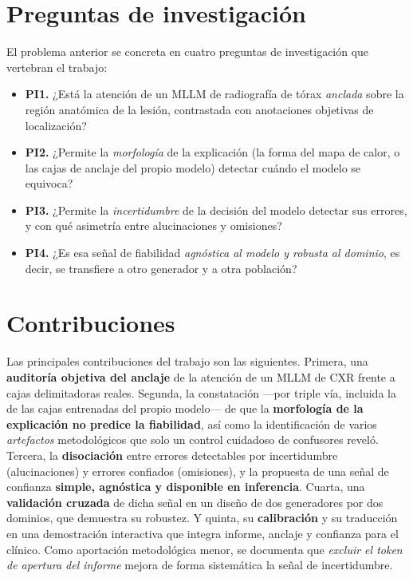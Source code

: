 \section{Preguntas de investigación}
El problema anterior se concreta en cuatro preguntas de investigación que vertebran el trabajo:
\begin{itemize}
  \item \textbf{PI1.} ¿Está la atención de un MLLM de radiografía de tórax \emph{anclada} sobre la
  región anatómica de la lesión, contrastada con anotaciones objetivas de localización?
  \item \textbf{PI2.} ¿Permite la \emph{morfología} de la explicación (la forma del mapa de calor, o
  las cajas de anclaje del propio modelo) detectar cuándo el modelo se equivoca?
  \item \textbf{PI3.} ¿Permite la \emph{incertidumbre} de la decisión del modelo detectar sus errores,
  y con qué asimetría entre alucinaciones y omisiones?
  \item \textbf{PI4.} ¿Es esa señal de fiabilidad \emph{agnóstica al modelo y robusta al dominio}, es
  decir, se transfiere a otro generador y a otra población?
\end{itemize}

\clearpage
\section{Contribuciones}
Las principales contribuciones del trabajo son las siguientes. Primera, una \textbf{auditoría
objetiva del anclaje} de la atención de un MLLM de CXR frente a cajas delimitadoras reales. Segunda,
la constatación —por triple vía, incluida la de las cajas entrenadas del propio modelo— de que la
\textbf{morfología de la explicación no predice la fiabilidad}, así como la identificación de varios
\emph{artefactos} metodológicos que solo un control cuidadoso de confusores reveló. Tercera, la
\textbf{disociación} entre errores detectables por incertidumbre (alucinaciones) y errores confiados
(omisiones), y la propuesta de una señal de confianza \textbf{simple, agnóstica y disponible en
inferencia}. Cuarta, una \textbf{validación cruzada} de dicha señal en un diseño de dos generadores
por dos dominios, que demuestra su robustez. Y quinta, su \textbf{calibración} y su traducción en una
demostración interactiva que integra informe, anclaje y confianza para el clínico. Como aportación
metodológica menor, se documenta que \emph{excluir el token de apertura del informe} mejora de forma
sistemática la señal de incertidumbre.

